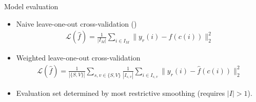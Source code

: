 \documentclass{beamer}
\begin{document}
\begin{frame}{Model evaluation}
\begin{itemize}
    \item Naive leave-one-out cross-validation (\citeauthor {Knox2019-ot})
    \begin{eqnarray*}
    \mathcal{L} ( \hat f) = \frac{1}{|I_M|} \sum_{i \in I_M} \| y_r(i) - \hat f(c(i)) \|_2^2 
    \end{eqnarray*}
    \item Weighted leave-one-out cross-validation
    \begin{eqnarray*}
    \mathcal{L} ( \hat f) = \frac{1}{|\{S,V\}|} \sum_{s,v \in \{S,V\}} \frac{1}{ |I_{s,v}|} \sum_{i \in I_{s,v} } \| y_r(i) - \hat f(c(i)) \|_2^2 
    \end{eqnarray*}
    \item Evaluation set determined by most restrictive smoothing (requires $|I| > 1$).%
\end{itemize}
\end{frame}
\end{document}
